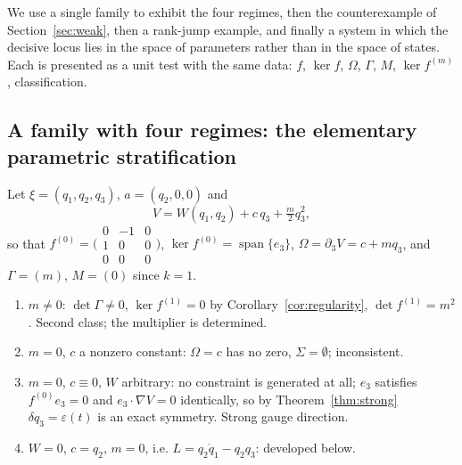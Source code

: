 \documentclass[12pt]{article}
\theoremstyle{plain}
\theoremstyle{definition}
\theoremstyle{remark}
\DeclareMathOperator{\spn}{span}
\newcommand{\pd}[1]{\partial_{#1}}
\newcommand{\Om}{\Omega}
\begin{document}
	We use a single family to exhibit the four regimes, then the counterexample of
	Section~\ref{sec:weak}, then a rank-jump example, and finally a system in which
	the decisive locus lies in the space of parameters rather than in the space of
	states. Each is presented as a unit test with the same data: $f$, $\ker f$,
	$\Om$, $\Gamma$, $M$, $\ker f^{(m)}$, classification.
	
	\subsection{A family with four regimes: the elementary parametric stratification}
	\label{sec:family}
	
	Let $\xi=(q_{1},q_{2},q_{3})$, $a=(q_{2},0,0)$ and
	\begin{equation}
		V=W(q_{1},q_{2})+c\,q_{3}+\tfrac{m}{2}q_{3}^{2},
		\label{eq:family}
	\end{equation}
	so that
	$f^{(0)}=\bigl(\begin{smallmatrix}0&-1&0\\1&0&0\\0&0&0\end{smallmatrix}\bigr)$,
	$\ker f^{(0)}=\spn\{e_{3}\}$, $\Om=\pd{3}V=c+mq_{3}$, and
	$\Gamma=(m)$, $M=(0)$ since $k=1$.
	
	\begin{enumerate}[label=\textbf{(\Roman*)},leftmargin=2.6em,itemsep=0.35em]
		\item $m\neq0$: $\det\Gamma\neq0$, $\ker f^{(1)}=0$ by
		Corollary~\ref{cor:regularity}, $\det f^{(1)}=m^{2}$. Second class;
		the multiplier is determined.
		\item $m=0$, $c$ a nonzero constant: $\Om=c$ has no zero,
		$\Sigma=\emptyset$; inconsistent.
		\item $m=0$, $c\equiv0$, $W$ arbitrary: no constraint is generated at all;
		$e_{3}$ satisfies $f^{(0)}e_{3}=0$ and $e_{3}\cdot\nabla V=0$ identically, so
		by Theorem~\ref{thm:strong} $\delta q_{3}=\varepsilon(t)$ is an exact
		symmetry. Strong gauge direction.
		\item $W=0$, $c=q_{2}$, $m=0$, i.e. $L=q_{2}\dot q_{1}-q_{2}q_{3}$:
		developed below.
	\end{enumerate}
	
\end{document}
